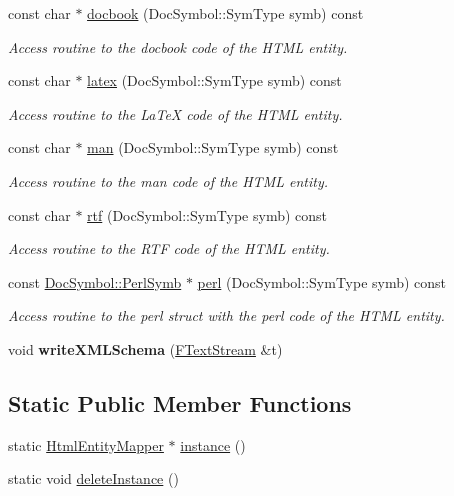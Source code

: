 \begin{DoxyCompactItemize}
const char $\ast$ \mbox{\hyperlink{class_html_entity_mapper_aa6d9fa38da68c64008be2a971953c5ca}{docbook}} (Doc\+Symbol\+::\+Sym\+Type symb) const
\begin{DoxyCompactList}\small\item\em Access routine to the docbook code of the H\+T\+ML entity. \end{DoxyCompactList}\item 
const char $\ast$ \mbox{\hyperlink{class_html_entity_mapper_ae1a658dacc27f6300042318c4dda97cf}{latex}} (Doc\+Symbol\+::\+Sym\+Type symb) const
\begin{DoxyCompactList}\small\item\em Access routine to the La\+TeX code of the H\+T\+ML entity. \end{DoxyCompactList}\item 
const char $\ast$ \mbox{\hyperlink{class_html_entity_mapper_aa0c9a67c19af23ac55194d75a900d39f}{man}} (Doc\+Symbol\+::\+Sym\+Type symb) const
\begin{DoxyCompactList}\small\item\em Access routine to the man code of the H\+T\+ML entity. \end{DoxyCompactList}\item 
const char $\ast$ \mbox{\hyperlink{class_html_entity_mapper_aa1e5d81261fbbe19364c6c4f5b9947df}{rtf}} (Doc\+Symbol\+::\+Sym\+Type symb) const
\begin{DoxyCompactList}\small\item\em Access routine to the R\+TF code of the H\+T\+ML entity. \end{DoxyCompactList}\item 
const \mbox{\hyperlink{struct_doc_symbol_1_1_perl_symb}{Doc\+Symbol\+::\+Perl\+Symb}} $\ast$ \mbox{\hyperlink{class_html_entity_mapper_aff1f6887be8ea6433a2cb33994aba368}{perl}} (Doc\+Symbol\+::\+Sym\+Type symb) const
\begin{DoxyCompactList}\small\item\em Access routine to the perl struct with the perl code of the H\+T\+ML entity. \end{DoxyCompactList}\item 
\mbox{\label{class_html_entity_mapper_a8aacc9cd8ba8159378ad2f143058ae49}} 
void {\bfseries write\+X\+M\+L\+Schema} (\mbox{\hyperlink{class_f_text_stream}{F\+Text\+Stream}} \&t)
\end{DoxyCompactItemize}
\subsection*{Static Public Member Functions}
\begin{DoxyCompactItemize}
\item 
static \mbox{\hyperlink{class_html_entity_mapper}{Html\+Entity\+Mapper}} $\ast$ \mbox{\hyperlink{class_html_entity_mapper_ae6ddba77b763691a6e3a1c9021e8d944}{instance}} ()
\item 
static void \mbox{\hyperlink{class_html_entity_mapper_aa45124007f692528edfa91ffbcb21f12}{delete\+Instance}} ()
\end{DoxyCompactItemize}


